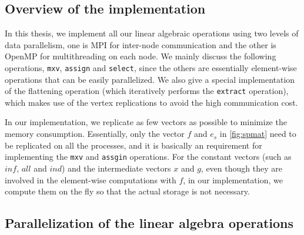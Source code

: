 \documentclass{sokendai_thesis} %
\newcommand{\boruvka}[0]{Boruvka}
\begin{document}
\subsection{Overview of the implementation}

In this thesis, we implement all our linear algebraic operations using two levels of data parallelism, one is MPI for inter-node communication and the other is OpenMP for multithreading on each node.
We mainly discuss the following operations, \texttt{mxv}, \texttt{assign} and \texttt{select}, since the others are essentially element-wise operations that can be easily parallelized.
We also give a special implementation of the flattening operation (which iteratively performs the \texttt{extract} operation), which makes use of the vertex replications to avoid the high communication cost.

In our implementation, we replicate as few vectors as possible to minimize the memory consumption.
Essentially, only the vector $\mathit{f}$ and $\mathit{e_s}$ in \autoref{fig:spmat} need to be replicated on all the processes, and it is basically an requirement for implementing the \texttt{mxv} and \texttt{assgin} operations.
For the constant vectors (such as $\mathit{inf}$, $\mathit{all}$ and $\mathit{ind}$) and the intermediate vectors $\mathit{x}$ and $\mathit{g}$, even though they are involved in the element-wise computations with $\mathit{f}$, in our implementation, we compute them on the fly so that the actual storage is not necessary.

\subsection{Parallelization of the linear algebra operations}
\end{document}
